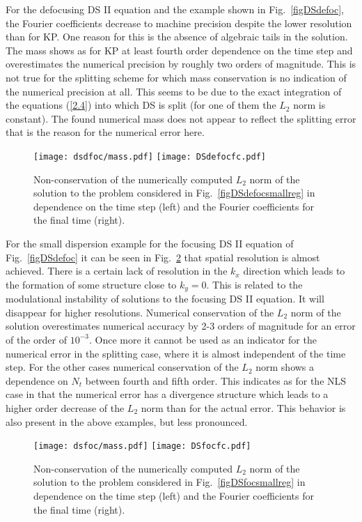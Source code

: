 \documentclass[final]{siamltex}
\begin{document}
For the defocusing DS II equation and the example shown in 
Fig.~\ref{figDSdefoc}, the Fourier coefficients decrease to machine 
precision despite the lower resolution than for KP. One reason 
for this is the absence of algebraic tails in the solution. The mass shows as for KP 
at least fourth order dependence on the time step and overestimates the 
numerical precision by roughly two orders of magnitude. This is not 
true for the splitting scheme for which mass conservation is no 
indication of the numerical precision at all. This seems to be due to 
the exact integration of the equations (\ref{2.4}) into which DS is 
split (for one of them the $L_{2}$ 
norm is constant). The found numerical mass does not appear to reflect the 
splitting error that is the reason for the numerical error here. 
\begin{figure}[htb!]
 \texttt{[image: dsdfoc/mass.pdf]}
 \texttt{[image: DSdefocfc.pdf]}
 \caption{Non-conservation of the numerically computed $L_{2}$ norm 
 of the solution to the problem considered in 
 Fig.~\ref{figDSdefocsmallreg} 
 in dependence on the time step
 (left) and the Fourier coefficients for the final time 
  (right). }
   \label{figDSdefocsmallmass}
\end{figure}

For the small dispersion example for the focusing DS II equation of 
Fig.~\ref{figDSdefoc} it can be seen in Fig.~\ref{figDSfocsmallmass} 
that spatial resolution is almost achieved. There is a certain lack of 
resolution in the $k_{x}$ direction which leads to the formation of 
some structure close to $k_{y}=0$. This is related to the 
modulational instability of solutions to the focusing DS II equation. 
It will disappear for higher resolutions. Numerical conservation of 
the $L_{2}$ norm of the solution overestimates numerical accuracy by 
2-3 orders of magnitude for an error of the order of $10^{-3}$. Once 
more it cannot be used as an indicator for the numerical error in the splitting case, where it is almost 
independent of the time step. For the other cases numerical 
conservation of the $L_{2}$ norm
shows a dependence on $N_{t}$ between fourth and fifth order. This 
indicates as for the NLS case in \cite{ckkdvnls} that the numerical 
error has a divergence structure which leads to a higher order 
decrease of the $L_{2}$ norm than for the actual error. This behavior 
is also present in the above examples, but less pronounced. 
\begin{figure}[htb!]
  \texttt{[image: dsfoc/mass.pdf]}
 \texttt{[image: DSfocfc.pdf]}
 \caption{Non-conservation of the numerically computed $L_{2}$ norm 
 of the solution to the problem considered in 
 Fig.~\ref{figDSfocsmallreg} 
 in dependence on the time step
 (left) and the Fourier coefficients for the final time 
  (right). }
  \label{figDSfocsmallmass}
\end{figure}
\end{document}
